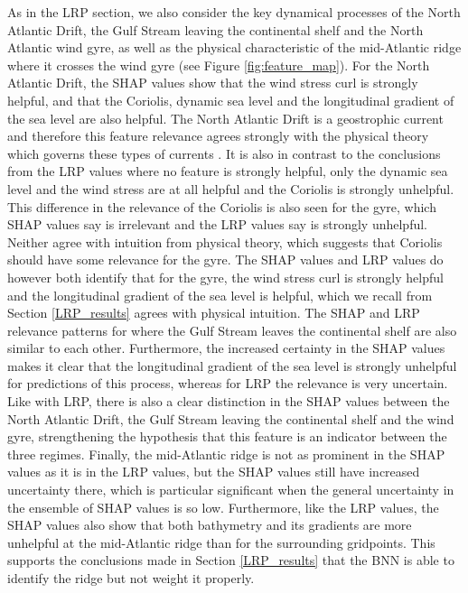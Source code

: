 \documentclass[a4paper]{article}
\begin{document}
As in the LRP section, we also consider the key dynamical processes of the North Atlantic Drift, the Gulf Stream leaving the continental shelf and the North Atlantic wind gyre, as well as the physical characteristic of the mid-Atlantic ridge where it crosses the wind gyre (see Figure \ref{fig:feature_map}). For the North Atlantic Drift, the SHAP values show that the wind stress curl is strongly helpful, and that the Coriolis, dynamic sea level and the longitudinal gradient of the sea level are also helpful. The North Atlantic Drift is a geostrophic current and therefore this feature relevance agrees strongly with the physical theory which governs these types of currents \citep{webb2021introduction}. It is also in contrast to the conclusions from the LRP values where no feature is strongly helpful, only the dynamic sea level and the wind stress are at all helpful and the Coriolis is strongly unhelpful. This difference in the relevance of the Coriolis is also seen for the gyre, which SHAP values say is irrelevant and the LRP values say is strongly unhelpful. Neither agree with intuition from physical theory, which suggests that Coriolis should have some relevance for the gyre. The SHAP values and LRP values do however both identify that for the gyre, the wind stress curl is strongly helpful and the longitudinal gradient of the sea level is helpful, which we recall from Section \ref{LRP_results} agrees with physical intuition. The SHAP and LRP relevance patterns for where the Gulf Stream leaves the continental shelf are also similar to each other. Furthermore, the increased certainty in the SHAP values makes it clear that the longitudinal gradient of the sea level is strongly unhelpful for predictions of this process, whereas for LRP the relevance is very uncertain. Like with LRP, there is also a clear distinction in the SHAP values between the North Atlantic Drift, the Gulf Stream leaving the continental shelf and the wind gyre, strengthening the hypothesis that this feature is an indicator between the three regimes. Finally, the mid-Atlantic ridge is not as prominent in the SHAP values as it is in the LRP values, but the SHAP values still have increased uncertainty there, which is particular significant when the general uncertainty in the ensemble of SHAP values is so low. Furthermore, like the LRP values, the SHAP values also show that both bathymetry and its gradients are more unhelpful at the mid-Atlantic ridge than for the surrounding gridpoints. This supports the conclusions made in Section \ref{LRP_results} that the BNN is able to identify the ridge but not weight it properly. 
\end{document}
